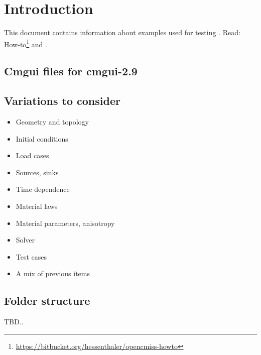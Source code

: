 %
\section{Introduction}
%
This document contains information about examples used for testing \iron.
Read: How-to\footnote{\url{https://bitbucket.org/hessenthaler/opencmiss-howto}}
and \cite{OpenCMISS2011}.
%
%
\subsection{Cmgui files for cmgui-2.9}
%
%
\subsection{Variations to consider}\label{variations-sec}
%
\begin{itemize}
    \item{Geometry and topology}
    \item{Initial conditions}
    \item{Load cases}
    \item{Sources, sinks}
    \item{Time dependence}
    \item{Material laws}
    \item{Material parameters, anisotropy}
    \item{Solver}
    \item{Test cases}
    \item{A mix of previous items}
\end{itemize}
%
%
\subsection{Folder structure}
%
TBD..
%
